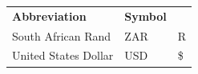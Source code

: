 {\begin{center}
\begin{xtabular*}{\mytablewidth}[t]{|p{10\mystarwidth}|p{10\mystarwidth}|p{10\mystarwidth}|}
        
                  \textbf{Abbreviation}
                 &
    
    
        
                  \textbf{Symbol}
     \tabularnewline{}
    
    
        South African Rand &
    
    
        ZAR &
    
    
        R%
     \tabularnewline{}
    
    
        United States Dollar &
    
    
        USD &
    
    
        \$%
     \tabularnewline{}
    

\end{xtabular*}
\end{center}}

